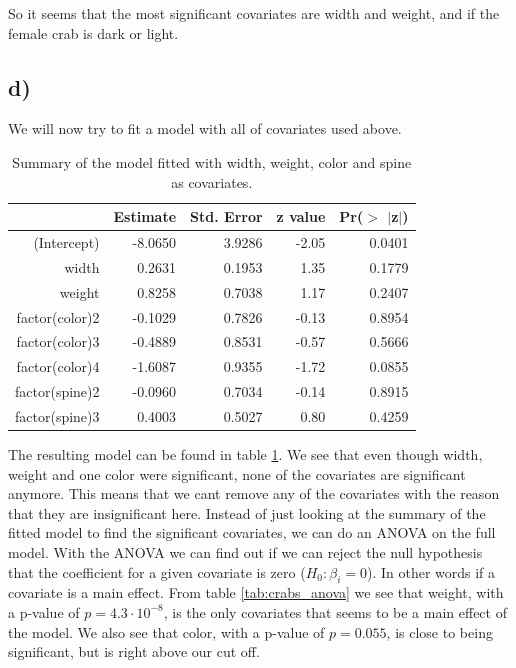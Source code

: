 \documentclass[a4paper,norsk, 10pt]{article}
\begin{document}
So it seems that the most significant covariates are width and weight, and if the female crab is dark or light.


\subsection{d)}

We will now try to fit a model with all of covariates used above.

\begin{table}[!htb]
\centering
\begin{tabular}{rrrrr}
  \hline
 & Estimate & Std. Error & z value & Pr($>$ $|$z$|$) \\ 
  \hline
(Intercept) & -8.0650 & 3.9286 & -2.05 & 0.0401 \\ 
  width & 0.2631 & 0.1953 & 1.35 & 0.1779 \\ 
  weight & 0.8258 & 0.7038 & 1.17 & 0.2407 \\ 
  factor(color)2 & -0.1029 & 0.7826 & -0.13 & 0.8954 \\ 
  factor(color)3 & -0.4889 & 0.8531 & -0.57 & 0.5666 \\ 
  factor(color)4 & -1.6087 & 0.9355 & -1.72 & 0.0855 \\ 
  factor(spine)2 & -0.0960 & 0.7034 & -0.14 & 0.8915 \\ 
  factor(spine)3 & 0.4003 & 0.5027 & 0.80 & 0.4259 \\ 
   \hline
\end{tabular}
\caption{Summary of the model fitted with width, weight, color and spine as covariates.}\label{tab:crabs_all}
\end{table}

The resulting model can be found in table \ref{tab:crabs_all}. We see that even though width, weight and one color were significant, none of the covariates are significant anymore. This means that we cant remove any of the covariates with the reason that they are insignificant here. Instead of just looking at the summary of the fitted model to find the significant covariates, we can do an ANOVA on the full model. With the ANOVA we can find out if we can reject the null hypothesis that the coefficient for a given covariate is zero ($H_0: \beta_i = 0$). In other words if a covariate is a main effect. From table \ref{tab:crabs_anova} we see that weight, with a p-value of $p= 4.3\cdot 10^{-8}$, is the only covariates that seems to be a main effect of the model. We also see that color, with a p-value of $p= 0.055$, is close to being significant, but is right above our cut off.
\end{document}
